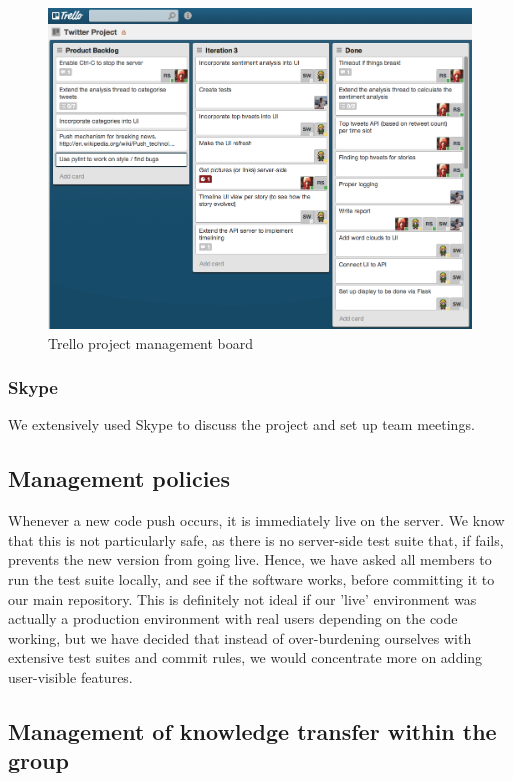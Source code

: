 \documentclass[a4paper,12pt]{article}
\begin{document}
			\begin{figure}[ht!]
						\centering
							\includegraphics[scale=0.4]{trello1.png}
						\caption{Trello project management board}
			\end{figure}
			
			\subsubsection{Skype}
			
			We extensively used Skype to discuss the project and set up team meetings.
		
		\subsection{Management policies}
		
		Whenever a new code push occurs, it is immediately live on the server. We know that this is not particularly safe, as there is no server-side test suite that, if fails, prevents the new version from going live. Hence, we have asked all members to run the test suite locally, and see if the software works, before committing it to our main repository. This is definitely not ideal if our 'live' environment was actually a production environment with real users depending on the code working, but we have decided that instead of over-burdening ourselves with extensive test suites and commit rules, we would concentrate more on adding user-visible features.
		
		\subsection{Management of knowledge transfer within the group}
		
\end{document}
